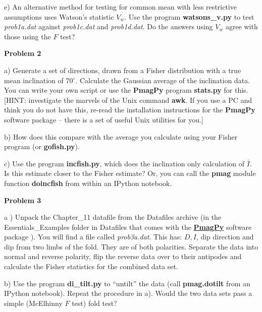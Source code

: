 {e)  An alternative method for testing for common mean with less restrictive assumptions uses  Watson's statistic $V_w$.  Use the program {\bf watsons\_v.py} to  test {\it prob1a.dat} against {\it prob1c.dat} and {\it prob1d.dat}.  Do the answers  using $V_w$ agree with those using the $F$ test?     



{\bf Problem 2} 

a)  Generate a set of directions, drawn from a Fisher distribution with a true mean inclination of 70$^{\circ}$.   Calculate the Gaussian average of the  inclination data.  You can write your own script or use the {\bf PmagPy} program {\bf stats.py} for this.  [HINT: investigate the marvels of the Unix command {\bf awk}.  If you use a PC and think you do not have this, re-read the installation instructions for the {\bf PmagPy} software package -- there is a set of useful Unix utilities for you.] 

b) How does this compare with the average you calculate using your Fisher program (or {\bf gofish.py}).

c) Use the program {\bf incfish.py}, which does the inclination only calculation of $\bar I$.  Is this estimate closer to the Fisher estimate?   Or, you can call the {\bf pmag} module function {\bf doincfish} from within an IPython notebook.  

{\bf Problem 3}

a ) Unpack the Chapter\_11 datafile from the Datafiles archive (in the Essentials\_Examples folder in Datafiles that comes with the \href{http://earthref.org/PmagPy/cookbook}{\bf PmagPy} software package ).   You will find a file called {\it prob3a.dat}.   This has:   $D, I$, dip direction and dip from two limbs of the fold.    They are of both polarities.   Separate the data into normal and reverse polarity,  flip the reverse data over to their antipodes and calculate the Fisher statistics for the combined data set.   


b)     Use the program {\bf di\_tilt.py} to ``untilt'' the data (call {\bf pmag.dotilt} from an IPython notebook).   Repeat the procedure in a).     Would the two data sets pass a simple (McElhinny $F$ test) fold test?  

}
